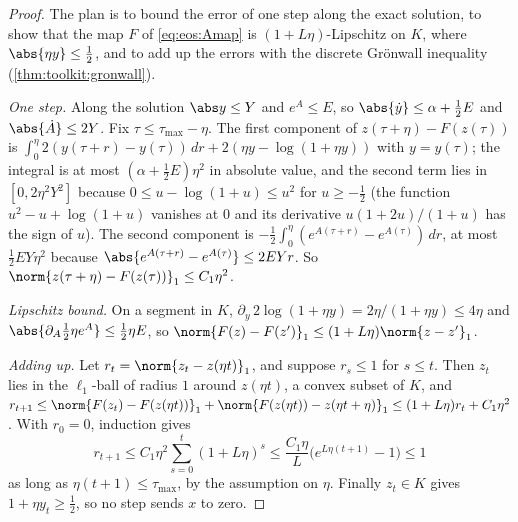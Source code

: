 \begin{refsection}

\begin{proof}
The plan is to bound the error of one step along the exact solution, to show that the map $F$ of \eqref{eq:eos:Amap} is $(1+L\eta)$-Lipschitz on $K$, where $\abs{\eta y}\le\frac12$, and to add up the errors with the discrete Grönwall inequality (\cref{thm:toolkit:gronwall}).

\emph{One step.} Along the solution $\abs y\le Y$ and $e^A\le E$, so $\abs{\dot y}\le\alpha+\frac12E$ and $\abs{\dot A}\le2Y$. Fix $\tau\le\tau_{\max}-\eta$. The first component of $z(\tau+\eta)-F(z(\tau))$ is $\int_0^\eta2(y(\tau+r)-y(\tau))\,dr+2(\eta y-\log(1+\eta y))$ with $y=y(\tau)$; the integral is at most $(\alpha+\frac12E)\eta^2$ in absolute value, and the second term lies in $[0,2\eta^2Y^2]$ because $0\le u-\log(1+u)\le u^2$ for $u\ge-\frac12$ (the function $u^2-u+\log(1+u)$ vanishes at $0$ and its derivative $u(1+2u)/(1+u)$ has the sign of $u$). The second component is $-\frac12\int_0^\eta(e^{A(\tau+r)}-e^{A(\tau)})\,dr$, at most $\frac12EY\eta^2$ because $\abs{e^{A(\tau+r)}-e^{A(\tau)}}\le2EYr$. So $\norm{z(\tau+\eta)-F(z(\tau))}_1\le C_1\eta^2$.

\emph{Lipschitz bound.} On a segment in $K$, $\partial_y\,2\log(1+\eta y)=2\eta/(1+\eta y)\le4\eta$ and $\abs{\partial_A\frac12\eta e^A}\le\frac12\eta E$, so $\norm{F(z)-F(z')}_1\le(1+L\eta)\norm{z-z'}_1$.

\emph{Adding up.} Let $r_t=\norm{z_t-z(\eta t)}_1$, and suppose $r_s\le1$ for $s\le t$. Then $z_t$ lies in the $\ell_1$-ball of radius $1$ around $z(\eta t)$, a convex subset of $K$, and $r_{t+1}\le\norm{F(z_t)-F(z(\eta t))}_1+\norm{F(z(\eta t))-z(\eta t+\eta)}_1\le(1+L\eta)r_t+C_1\eta^2$. With $r_0=0$, induction gives
\[
  r_{t+1}\le C_1\eta^2\sum_{s=0}^{t}(1+L\eta)^s\le\frac{C_1\eta}L\bigl(e^{L\eta(t+1)}-1\bigr)\le1
\]
as long as $\eta(t+1)\le\tau_{\max}$, by the assumption on $\eta$. Finally $z_t\in K$ gives $1+\eta y_t\ge\frac12$, so no step sends $x$ to zero.
\end{proof}


\end{refsection}
